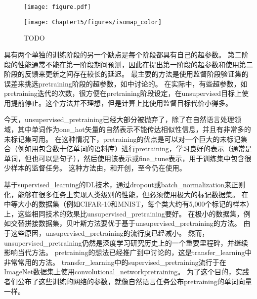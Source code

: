 
\begin{figure}[!htb]
\ifOpenSource
\centerline{\texttt{[image: figure.pdf]}}
\else
\centerline{\texttt{[image: Chapter15/figures/isomap\_color]}}
\fi
\caption{TODO}
\label{fig:chap15_isomap}
\end{figure}


具有两个单独的训练阶段的另一个缺点是每个阶段都具有自己的超参数。
第二阶段的性能通常不能在第一阶段期间预测，因此在提出第一阶段的超参数和使用第二阶段的反馈来更新之间存在较长的延迟。
最主要的方法是使用监督阶段验证集的误差来挑选\gls{pretraining}阶段的超参数，如\cite{Larochelle-jmlr-2009}中讨论的。
在实际中，有些超参数，如\gls{pretraining}迭代的次数，很方便在\gls{pretraining}阶段设定，在\gls{unsupervised}目标上使用提前停止。这个方法并不理想，但是计算上比使用监督目标代价小得多。


今天，\gls{unsupervised_pretraining}已经大部分被抛弃了，除了在自然语言处理领域，其中单词作为\gls{one_hot}矢量的自然表示不能传达相似性信息，并且有非常多的未标记集可用。
在这种情况下，\gls{pretraining}的优点是可以对一个巨大的未标记集合（例如用包含数十亿单词的语料库）进行\gls{pretraining}，学习良好的表示（通常是单词，但也可以是句子），然后使用该表示或\gls{fine_tune}表示，用于训练集中包含很少样本的监督任务。
这种方法由\cite{CollobertR2008-small}，\cite{Turian+Ratinov+Bengio-2010-small}和\cite{collobert2011natural}开创，至今仍在使用。


基于\gls{supervised_learning}的\gls{DL}技术，通过\gls{dropout}或\gls{batch_normalization}来正则化，能够在很多任务上实现人类级别的性能，但必须使用极大的标记数据集。
在中等大小的数据集（例如CIFAR-10和MNIST，每个类大约有5,000个标记的样本）上，这些相同技术的效果比\gls{unsupervised_pretraining}要好。
在极小的数据集，例如交替拼接数据集，贝叶斯方法要优于基于\gls{unsupervised_pretraining}的方法\citep{Srivastava-master-small}。
由于这些原因，\gls{unsupervised_pretraining}的流行度已经减小。
然而，\gls{unsupervised_pretraining}仍然是深度学习研究历史上的一个重要里程碑，并继续影响当代方法。
\gls{pretraining}的想法已经推广到中讨论的，这是\gls{transfer_learning}中非常常用的方法。
\gls{transfer_learning}中的\gls{supervised_pretraining}流行\citep{Oquab-et-al-CVPR2014,yosinski-nips2014}于在ImageNet数据集上使用\gls{convolutional_network}\gls{pretraining}。
为了这个目的，实践者们公布了这些训练的网络的参数，就像自然语言任务公布\gls{pretraining}的单词向量一样\citep{collobert2011natural,Mikolov-et-al-ICLR2013}。

